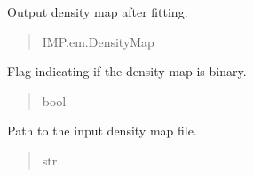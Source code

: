 \documentclass[letterpaper,10pt,english]{sphinxmanual}
\begin{document}
\begin{fulllineitems}
\begin{fulllineitems}
\label{\detokenize{src:src.BagelFitter.BagelFitter.dmap_out}}
\pysigstartsignatures
{}
\pysigstopsignatures
\sphinxAtStartPar
Output density map after fitting.
\begin{quote}\begin{description}
\sphinxAtStartPar
IMP.em.DensityMap

\end{description}\end{quote}

\end{fulllineitems}


\begin{fulllineitems}
\label{\detokenize{src:src.BagelFitter.BagelFitter.dmap_out_binary_flag}}
\pysigstartsignatures
{}
\pysigstopsignatures
\sphinxAtStartPar
Flag indicating if the density map is binary.
\begin{quote}\begin{description}
\sphinxAtStartPar
bool

\end{description}\end{quote}

\end{fulllineitems}


\begin{fulllineitems}
\label{\detokenize{src:src.BagelFitter.BagelFitter.input_map_path}}
\pysigstartsignatures
{}
\pysigstopsignatures
\sphinxAtStartPar
Path to the input density map file.
\begin{quote}\begin{description}
\sphinxAtStartPar
str

\end{description}\end{quote}

\end{fulllineitems}


\end{fulllineitems}
\end{document}
